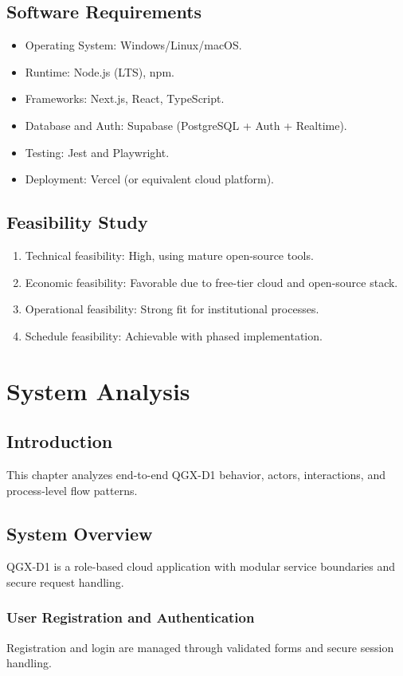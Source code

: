 \documentclass[12pt,a4paper]{article}
\begin{document}
\subsection{Software Requirements}
\begin{itemize}
\item Operating System: Windows/Linux/macOS.
\item Runtime: Node.js (LTS), npm.
\item Frameworks: Next.js, React, TypeScript.
\item Database and Auth: Supabase (PostgreSQL + Auth + Realtime).
\item Testing: Jest and Playwright.
\item Deployment: Vercel (or equivalent cloud platform).
\end{itemize}

\subsection{Feasibility Study}
\begin{enumerate}
\item Technical feasibility: High, using mature open-source tools.
\item Economic feasibility: Favorable due to free-tier cloud and open-source stack.
\item Operational feasibility: Strong fit for institutional processes.
\item Schedule feasibility: Achievable with phased implementation.
\end{enumerate}

\section{System Analysis}

\subsection{Introduction}
This chapter analyzes end-to-end QGX-D1 behavior, actors, interactions, and process-level flow patterns.

\subsection{System Overview}
QGX-D1 is a role-based cloud application with modular service boundaries and secure request handling.

\subsubsection{User Registration and Authentication}
Registration and login are managed through validated forms and secure session handling.
\end{document}

